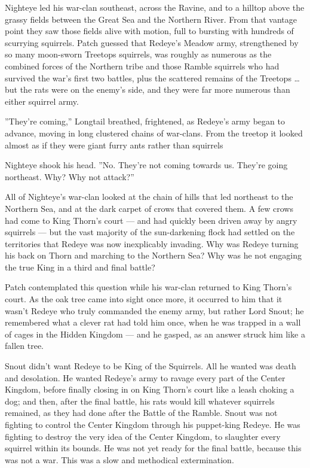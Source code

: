 \documentclass[12pt]{book}
\begin{document}
Nighteye led his war-clan southeast, across the Ravine, and to a
hilltop above the grassy fields between the Great Sea and the Northern
River. From that vantage point they saw those fields alive with
motion, full to bursting with hundreds of scurrying squirrels. Patch
guessed that Redeye's Meadow army, strengthened by so many moon-sworn
Treetops squirrels, was roughly as numerous as the combined forces of
the Northern tribe and those Ramble squirrels who had survived the
war's first two battles, plus the scattered remains of the Treetops
\ldots{} but the rats were on the enemy's side, and they were far more
numerous than either squirrel army.

''They're coming,'' Longtail breathed, frightened, as Redeye's army
began to advance, moving in long clustered chains of war-clans. From
the treetop it looked almost as if they were giant furry ants rather
than squirrels

Nighteye shook his head. ''No. They're not coming towards us. They're
going northeast. Why? Why not attack?''

All of Nighteye's war-clan looked at the chain of hills that led
northeast to the Northern Sea, and at the dark carpet of crows that
covered them. A few crows had come to King Thorn's court --- and had
quickly been driven away by angry squirrels --- but the vast majority
of the sun-darkening flock had settled on the territories that Redeye
was now inexplicably invading. Why was Redeye turning his back on
Thorn and marching to the Northern Sea? Why was he not engaging the
true King in a third and final battle?

Patch contemplated this question while his war-clan returned to King
Thorn's court. As the oak tree came into sight once more, it occurred
to him that it wasn't Redeye who truly commanded the enemy army, but
rather Lord Snout; he remembered what a clever rat had told him once,
when he was trapped in a wall of cages in the Hidden Kingdom --- and
he gasped, as an answer struck him like a fallen tree.

Snout didn't want Redeye to be King of the Squirrels. All he wanted
was death and desolation. He wanted Redeye's army to ravage every part
of the Center Kingdom, before finally closing in on King Thorn's court
like a leash choking a dog; and then, after the final battle, his rats
would kill whatever squirrels remained, as they had done after the
Battle of the Ramble. Snout was not fighting to control the Center
Kingdom through his puppet-king Redeye. He was fighting to destroy the
very idea of the Center Kingdom, to slaughter every squirrel within
its bounds. He was not yet ready for the final battle, because this
was not a war. This was a slow and methodical extermination.
\end{document}
